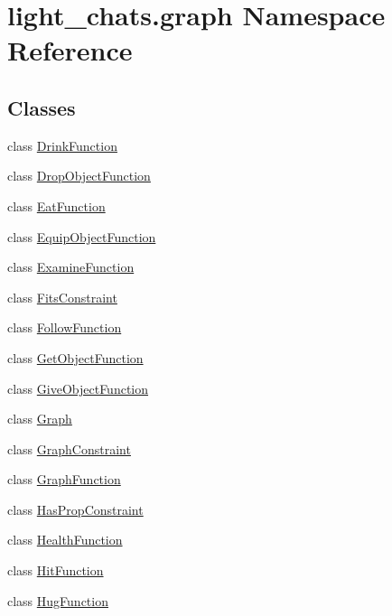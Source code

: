 \hypertarget{namespacelight__chats_1_1graph}{}\section{light\+\_\+chats.\+graph Namespace Reference}
\label{namespacelight__chats_1_1graph}
\subsection*{Classes}
\begin{DoxyCompactItemize}
\item 
class \hyperlink{classlight__chats_1_1graph_1_1DrinkFunction}{Drink\+Function}
\item 
class \hyperlink{classlight__chats_1_1graph_1_1DropObjectFunction}{Drop\+Object\+Function}
\item 
class \hyperlink{classlight__chats_1_1graph_1_1EatFunction}{Eat\+Function}
\item 
class \hyperlink{classlight__chats_1_1graph_1_1EquipObjectFunction}{Equip\+Object\+Function}
\item 
class \hyperlink{classlight__chats_1_1graph_1_1ExamineFunction}{Examine\+Function}
\item 
class \hyperlink{classlight__chats_1_1graph_1_1FitsConstraint}{Fits\+Constraint}
\item 
class \hyperlink{classlight__chats_1_1graph_1_1FollowFunction}{Follow\+Function}
\item 
class \hyperlink{classlight__chats_1_1graph_1_1GetObjectFunction}{Get\+Object\+Function}
\item 
class \hyperlink{classlight__chats_1_1graph_1_1GiveObjectFunction}{Give\+Object\+Function}
\item 
class \hyperlink{classlight__chats_1_1graph_1_1Graph}{Graph}
\item 
class \hyperlink{classlight__chats_1_1graph_1_1GraphConstraint}{Graph\+Constraint}
\item 
class \hyperlink{classlight__chats_1_1graph_1_1GraphFunction}{Graph\+Function}
\item 
class \hyperlink{classlight__chats_1_1graph_1_1HasPropConstraint}{Has\+Prop\+Constraint}
\item 
class \hyperlink{classlight__chats_1_1graph_1_1HealthFunction}{Health\+Function}
\item 
class \hyperlink{classlight__chats_1_1graph_1_1HitFunction}{Hit\+Function}
\item 
class \hyperlink{classlight__chats_1_1graph_1_1HugFunction}{Hug\+Function}

\end{DoxyCompactItemize}

